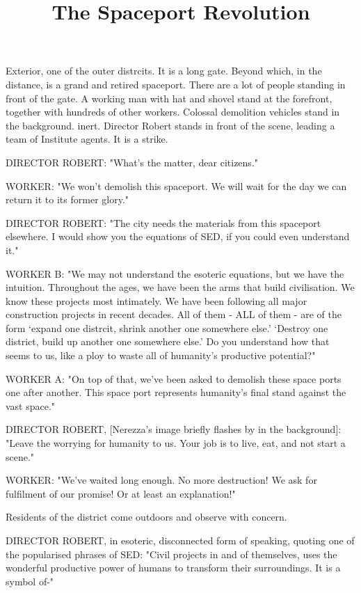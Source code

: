 \documentclass[11pt]{article}
\begin{document}
\ttfamily
\title{The Spaceport Revolution}
\maketitle

Exterior, one of the outer distrcits. 
It is a long gate.
Beyond which, in the distance, is a grand and retired spaceport.
There are a lot of people standing in front of the gate.
A working man with hat and shovel stand at the forefront, together with hundreds of other workers. 
Colossal demolition vehicles stand in the background. inert.
Director Robert stands in front of the scene, leading a team of Institute agents. 
It is a strike.

DIRECTOR ROBERT: "What's the matter, dear citizens."

WORKER: "We won't demolish this spaceport.
We will wait for the day we can return it to its former glory."

DIRECTOR ROBERT: "The city needs the materials from this spaceport elsewhere. 
I would show you the equations of SED, if you could even understand it."

WORKER B: "We may not understand the esoteric equations, but we have the intuition.
Throughout the ages, we have been the arms that build civilisation.
We know these projects most intimately.
We have been following all major construction projects in recent decades.
All of them - ALL of them - are of the form `expand one distrcit, shrink another one somewhere else.' 
`Destroy one district, build up another one somewhere else.'
Do you understand how that seems to us, like a ploy to waste all of humanity's productive potential?"

WORKER A: "On top of that, we've been asked to demolish these space ports one after another. 
This space port represents humanity's final stand against the vast space."

DIRECTOR ROBERT, [Nerezza's image briefly flashes by in the background]: "Leave the worrying for humanity to us. 
Your job is to live, eat, and not start a scene."

WORKER: "We've waited long enough.
No more destruction! 
We ask for fulfilment of our promise!
Or at least an explanation!"

Residents of the district come outdoors and observe with concern.

DIRECTOR ROBERT, in esoteric, disconnected form of speaking, quoting one of the popularised phrases of SED: "Civil projects in and of themselves, uses the wonderful productive power of humans to transform their surroundings. 
It is a symbol of-"
\end{document}
